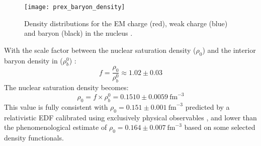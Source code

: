 \begin{figure}[!h]
    \centering
    \texttt{[image: prex\_baryon\_density]}
    \caption{Density distributions for the EM charge (red), weak charge (blue) and
    baryon (black) in the \Pb nucleus \cite{PhysRevLett.126.172502}.}
    \label{fig:saturation_density}
\end{figure}

With the scale factor between the nuclear saturation density ($\rho_0$) and the interior
baryon density in \Pb ($\rho^0_b$) \cite{PhysRevC.102.044321}:
\begin{equation}
    f = \frac{\rho_0}{\rho^0_b} \approx 1.02 \pm 0.03
\end{equation}
The nuclear saturation density becomes:
\begin{equation}
    \rho_0 = f \times \rho_b^0 = 0.1510 \pm 0.0059 \ \mathrm{fm}^{-3}
\end{equation}
This value is fully consistent with $\rho_0 = 0.151 \pm 0.001 \ \mathrm{fm}^{-3}$ predicted
by a relativistic EDF calibrated using exclusively physical observables \cite{PhysRevC.90.044305},
and lower than the phenomenological estimate of $\rho_0 = 0.164 \pm 0.007 \ \mathrm{fm}^{-3}$ \cite{PhysRevLett.122.042501}
based on some selected density functionals.


